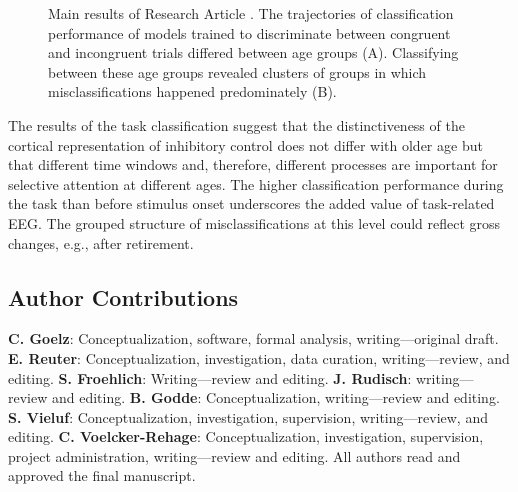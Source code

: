 \begin{figure}[h]
\begin{center}

\caption[Main results of Research Article .]{Main results of Research Article . The trajectories of classification performance of models trained to discriminate between congruent and incongruent trials differed between age groups (A). Classifying between these age groups revealed clusters of groups in which misclassifications happened predominately (B).}
\label{fig:results2}
\end{center}
\end{figure}
\noindent The results of the task classification suggest that the distinctiveness of the cortical representation of inhibitory control does not differ with older age but that different time windows and, therefore, different processes are important for selective attention at different ages. The higher classification performance during the task
than before stimulus onset underscores the added value of task-related EEG. The grouped structure of misclassifications at this level could reflect gross changes, e.g., after retirement. 


\subsection*{Author Contributions}
\textbf{C. Goelz}: Conceptualization, software, formal analysis, writing—original draft.
\textbf{E. Reuter}: Conceptualization, investigation, data curation, writing—review, and editing.
\textbf{S. Froehlich}: Writing—review and editing. 
\textbf{J. Rudisch}: writing—review and editing.
\textbf{B. Godde}: Conceptualization, writing—review and editing.
\textbf{S. Vieluf}: Conceptualization, investigation, supervision, writing—review, and editing.
\textbf{C. Voelcker-Rehage}: Conceptualization, investigation, supervision, project administration, writing—review and editing. All authors read and approved the final manuscript.

